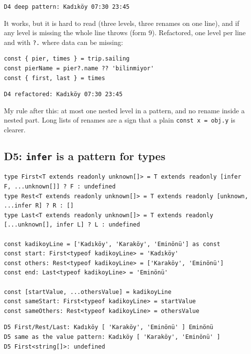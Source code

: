 \documentclass[
  10pt,
]{article}
\begin{document}
\begin{verbatim}
D4 deep pattern: Kadıköy 07:30 23:45
\end{verbatim}

It works, but it is hard to read (three levels, three renames on one
line), and if any level is missing the whole line throws (form 9).
Refactored, one level per line and with \texttt{?.\allowbreak{}} where
data can be missing:

\begin{verbatim}
const { pier, times } = trip.sailing
const pierName = pier?.name ?? 'bilinmiyor'
const { first, last } = times
\end{verbatim}

\begin{verbatim}
D4 refactored: Kadıköy 07:30 23:45
\end{verbatim}

My rule after this: at most one nested level in a pattern, and no rename
inside a nested part. Long lists of renames are a sign that a plain
\texttt{const x =\allowbreak{} obj.\allowbreak{}y} is clearer.

\hypertarget{d5-infer-is-a-pattern-for-types}{%
\subsection{\texorpdfstring{D5: \texttt{infer} is a pattern for
types}{D5:  is a pattern for types}}\label{d5-infer-is-a-pattern-for-types}}

\begin{verbatim}
type First<T extends readonly unknown[]> = T extends readonly [infer F, ...unknown[]] ? F : undefined
type Rest<T extends readonly unknown[]> = T extends readonly [unknown, ...infer R] ? R : []
type Last<T extends readonly unknown[]> = T extends readonly [...unknown[], infer L] ? L : undefined

const kadikoyLine = ['Kadıköy', 'Karaköy', 'Eminönü'] as const
const start: First<typeof kadikoyLine> = 'Kadıköy'
const others: Rest<typeof kadikoyLine> = ['Karaköy', 'Eminönü']
const end: Last<typeof kadikoyLine> = 'Eminönü'

const [startValue, ...othersValue] = kadikoyLine
const sameStart: First<typeof kadikoyLine> = startValue
const sameOthers: Rest<typeof kadikoyLine> = othersValue
\end{verbatim}

\begin{verbatim}
D5 First/Rest/Last: Kadıköy [ 'Karaköy', 'Eminönü' ] Eminönü
D5 same as the value pattern: Kadıköy [ 'Karaköy', 'Eminönü' ]
D5 First<string[]>: undefined
\end{verbatim}
\end{document}

